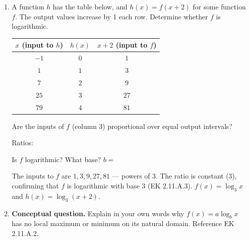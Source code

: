 \documentclass[10pt]{article}
\begin{document}
\begin{enumerate}[leftmargin=1.8em, itemsep=14pt]
\begin{enumerate}[leftmargin=1.5em, itemsep=8pt, label=\alph*.]
\end{enumerate}

\item A function $h$ has the table below, and $h(x) = f(x + 2)$ for some function $f$.
      The output values increase by 1 each row. Determine whether $f$ is logarithmic.

\vspace{6pt}
\begin{center}
\renewcommand{\arraystretch}{1.8}
\begin{tabular}{|c|c|c|}
\hline
\rowcolor{sky}
$x$ (input to $h$) & $h(x)$ & $x + 2$ (input to $f$) \\
\hline
$-1$ & $0$ & $1$ \\
\hline
$1$  & $1$ & $3$ \\
\hline
$7$  & $2$ & $9$ \\
\hline
$25$ & $3$ & $27$ \\
\hline
$79$ & $4$ & $81$ \\
\hline
\end{tabular}
\end{center}

\vspace{6pt}
Are the inputs of $f$ (column 3) proportional over equal output intervals?

\vspace{4pt}
Ratios: 

\vspace{4pt}
Is $f$ logarithmic?  \quad What base? $b = $ 

\begin{teachernote}
The inputs to $f$ are $1, 3, 9, 27, 81$ --- powers of 3. The ratio is constant (3), confirming
that $f$ is logarithmic with base 3 (EK 2.11.A.3). $f(x) = \log_3 x$ and $h(x) = \log_3(x+2)$.
\end{teachernote}

\item \textbf{Conceptual question.} Explain in your own words why $f(x) = a\log_b x$ has
      no local maximum or minimum on its natural domain. Reference EK 2.11.A.2.



\end{enumerate}
\end{document}

